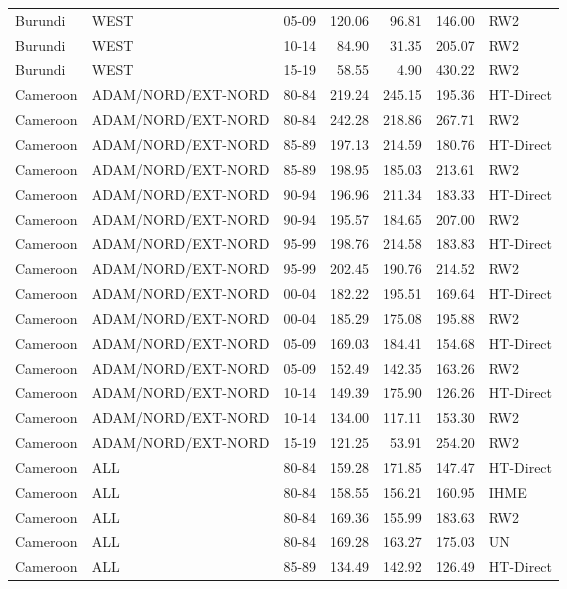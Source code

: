 \begin{longtable}{lllrrrl}
  Burundi & WEST & 05-09 & 120.06 & 96.81 & 146.00 & RW2 \\ 
  Burundi & WEST & 10-14 & 84.90 & 31.35 & 205.07 & RW2 \\ 
  Burundi & WEST & 15-19 & 58.55 & 4.90 & 430.22 & RW2 \\ 
  Cameroon & ADAM/NORD/EXT-NORD & 80-84 & 219.24 & 245.15 & 195.36 & HT-Direct \\ 
  Cameroon & ADAM/NORD/EXT-NORD & 80-84 & 242.28 & 218.86 & 267.71 & RW2 \\ 
  Cameroon & ADAM/NORD/EXT-NORD & 85-89 & 197.13 & 214.59 & 180.76 & HT-Direct \\ 
  Cameroon & ADAM/NORD/EXT-NORD & 85-89 & 198.95 & 185.03 & 213.61 & RW2 \\ 
  Cameroon & ADAM/NORD/EXT-NORD & 90-94 & 196.96 & 211.34 & 183.33 & HT-Direct \\ 
  Cameroon & ADAM/NORD/EXT-NORD & 90-94 & 195.57 & 184.65 & 207.00 & RW2 \\ 
  Cameroon & ADAM/NORD/EXT-NORD & 95-99 & 198.76 & 214.58 & 183.83 & HT-Direct \\ 
  Cameroon & ADAM/NORD/EXT-NORD & 95-99 & 202.45 & 190.76 & 214.52 & RW2 \\ 
  Cameroon & ADAM/NORD/EXT-NORD & 00-04 & 182.22 & 195.51 & 169.64 & HT-Direct \\ 
  Cameroon & ADAM/NORD/EXT-NORD & 00-04 & 185.29 & 175.08 & 195.88 & RW2 \\ 
  Cameroon & ADAM/NORD/EXT-NORD & 05-09 & 169.03 & 184.41 & 154.68 & HT-Direct \\ 
  Cameroon & ADAM/NORD/EXT-NORD & 05-09 & 152.49 & 142.35 & 163.26 & RW2 \\ 
  Cameroon & ADAM/NORD/EXT-NORD & 10-14 & 149.39 & 175.90 & 126.26 & HT-Direct \\ 
  Cameroon & ADAM/NORD/EXT-NORD & 10-14 & 134.00 & 117.11 & 153.30 & RW2 \\ 
  Cameroon & ADAM/NORD/EXT-NORD & 15-19 & 121.25 & 53.91 & 254.20 & RW2 \\ 
  Cameroon & ALL & 80-84 & 159.28 & 171.85 & 147.47 & HT-Direct \\ 
  Cameroon & ALL & 80-84 & 158.55 & 156.21 & 160.95 & IHME \\ 
  Cameroon & ALL & 80-84 & 169.36 & 155.99 & 183.63 & RW2 \\ 
  Cameroon & ALL & 80-84 & 169.28 & 163.27 & 175.03 & UN \\ 
  Cameroon & ALL & 85-89 & 134.49 & 142.92 & 126.49 & HT-Direct \\ 

\end{longtable}
